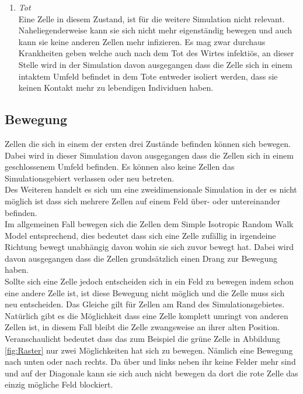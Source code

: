 \begin{enumerate}
\item{\emph{Tot}\\
Eine Zelle in diesem Zustand, ist für die weitere Simulation nicht relevant. Naheliegenderweise kann sie sich nicht mehr eigenständig bewegen und auch kann sie keine anderen Zellen mehr infizieren. Es mag zwar durchaus Krankheiten geben welche auch nach dem Tot des Wirtes infektiös, an dieser Stelle wird in der Simulation davon ausgegangen dass die Zelle sich in einem intaktem Umfeld befindet in dem Tote entweder isoliert werden, dass sie keinen Kontakt mehr zu lebendigen Individuen haben. 
}
\end{enumerate}

\subsection*{Bewegung}
Zellen die sich in einem der ersten drei Zustände befinden können sich bewegen. Dabei wird in dieser Simulation davon ausgegangen dass die Zellen sich in einem geschlossenem Umfeld befinden. Es können also keine Zellen das Simulationsgebiert verlassen oder neu betreten.\\
Des Weiteren handelt es sich um eine zweidimensionale Simulation in der es nicht möglich ist dass sich mehrere Zellen auf einem Feld über- oder untereinander befinden.\\
Im allgemeinen Fall bewegen sich die Zellen dem Simple Isotropic  Random Walk Model \cite{Codling:2008} entsprechend, dies bedeutet dass sich eine Zelle zufällig in irgendeine Richtung bewegt unabhängig davon wohin sie sich zuvor bewegt hat. Dabei wird davon ausgegangen dass die Zellen grundsätzlich einen Drang zur Bewegung haben.\\
Sollte sich eine Zelle jedoch entscheiden sich in ein Feld zu bewegen indem schon eine andere Zelle ist, ist diese Bewegung nicht möglich und die Zelle muss sich neu entscheiden. Das Gleiche gilt für Zellen am Rand des Simulationsgebietes. Natürlich gibt es die Möglichkeit dass eine Zelle komplett \glqq umringt\grqq\; von anderen Zellen ist, in diesem Fall bleibt die Zelle zwangsweise an ihrer alten Position.\\
Veranschaulicht bedeutet dass das zum Beispiel die grüne Zelle in Abbildung \ref{fig:Raster} nur zwei Möglichkeiten hat sich zu bewegen. Nämlich eine Bewegung nach unten oder nach rechts. Da über und links neben ihr keine Felder mehr sind und auf der Diagonale kann sie sich auch nicht bewegen da dort die rote Zelle das einzig mögliche Feld blockiert.\\
